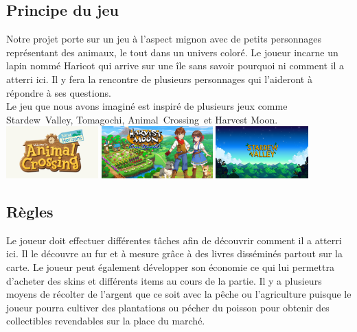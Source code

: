 \documentclass{article}
\begin{document}
\subsection{Principe du jeu}

Notre projet porte sur un jeu à l'aspect mignon avec de petits personnages représentant des animaux, le tout dans un univers coloré. Le joueur incarne un lapin nommé Haricot qui arrive sur une île sans savoir pourquoi ni comment il a atterri ici. Il y fera la rencontre de plusieurs personnages qui l'aideront à répondre à ses questions.\\ 

Le jeu que nous avons imaginé est inspiré de plusieurs jeux comme Stardew~Valley, Tomagochi, Animal~Crossing~et Harvest Moon.\\
\newline
\includegraphics[height = 2cm]{AClogo.png}
\hspace{7pt}
\includegraphics[height = 2cm]{HMlogo.jpg}
\hspace{7pt}
\includegraphics[height = 2cm]{SVlogo.jpeg}

\subsection{Règles}

Le joueur doit effectuer différentes tâches afin de découvrir comment il a atterri ici. Il le découvre au fur et à mesure grâce à des livres disséminés partout sur la carte. Le joueur peut également développer son économie ce qui lui permettra d'acheter des skins et différents items au cours de la partie. Il y a plusieurs moyens de récolter de l'argent que ce soit avec la pêche ou l'agriculture puisque le joueur pourra cultiver des plantations ou pécher du poisson pour obtenir des collectibles revendables sur la place du marché.
\\
\end{document}
